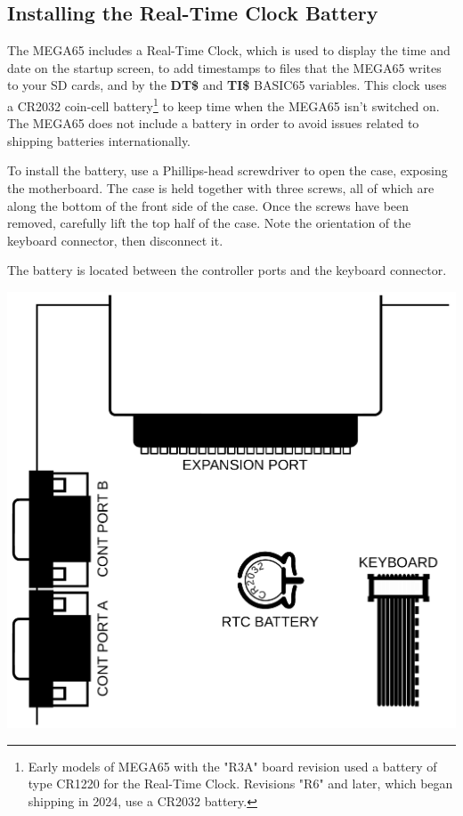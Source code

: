 \subsection{Installing the Real-Time Clock Battery}

The MEGA65 includes a Real-Time Clock, which is used to display the time and date on the startup screen, to add timestamps to files that the MEGA65 writes to your SD cards, and by the {\bf DT\$} and {\bf TI\$} BASIC65 variables. This clock uses a CR2032 coin-cell battery\footnote{Early models of MEGA65 with the "R3A" board revision used a battery of type CR1220 for the Real-Time Clock. Revisions "R6" and later, which began shipping in 2024, use a CR2032 battery.} to keep time when the MEGA65 isn't switched on. The MEGA65 does not include a battery in order to avoid issues related to shipping batteries internationally.

To install the battery, use a Phillips-head screwdriver to open the case, exposing the motherboard. The case is held together with three screws, all of which are along the bottom of the front side of the case. Once the screws have been removed, carefully lift the top half of the case. Note the orientation of the keyboard connector, then disconnect it.

The battery is located between the controller ports and the keyboard connector.

\includegraphics[width=\linewidth]{images/illustrations/rtc-battery-location.pdf}

